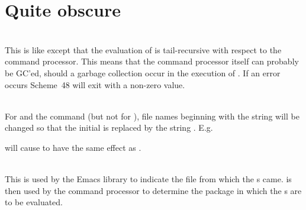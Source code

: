 \section{Quite obscure}

\begin{description}
\item {}\\
    This is like  except that the evaluation of 
    is tail-recursive with respect to the command processor.  This
    means that the command processor itself can probably be GC'ed,
    should a garbage collection occur in the execution of .
    If an error occurs Scheme~48 will exit with a non-zero value.

\item {}\\
    For  and the  command
     (but not for ), file
    names beginning with the string  will be changed so that the
    initial  is replaced by the string .  E.g.
\begin{example}
\end{example}
    will cause  to have the same effect as
    .

\item {}\\
    This is used by the  Emacs library to indicate the file
    from which the s came.   is then used by the
    command processor to determine the package in which the s
    are to be evaluated.
\end{description}


